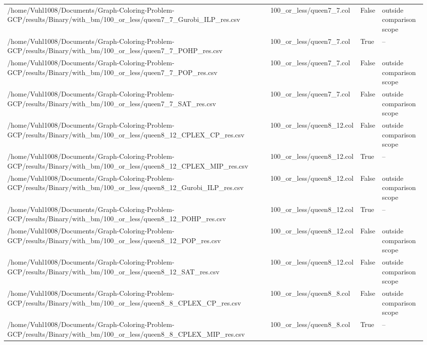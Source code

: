\begin{table}[htbp]
\begin{tabular}{llll}
/home/Vuhl1008/Documents/Graph-Coloring-Problem-GCP/results/Binary/with\_bm/100\_or\_less/queen7\_7\_Gurobi\_ILP\_res.csv & 100\_or\_less/queen7\_7.col & False & outside comparison scope \\
/home/Vuhl1008/Documents/Graph-Coloring-Problem-GCP/results/Binary/with\_bm/100\_or\_less/queen7\_7\_POHP\_res.csv & 100\_or\_less/queen7\_7.col & True & -- \\
/home/Vuhl1008/Documents/Graph-Coloring-Problem-GCP/results/Binary/with\_bm/100\_or\_less/queen7\_7\_POP\_res.csv & 100\_or\_less/queen7\_7.col & False & outside comparison scope \\
/home/Vuhl1008/Documents/Graph-Coloring-Problem-GCP/results/Binary/with\_bm/100\_or\_less/queen7\_7\_SAT\_res.csv & 100\_or\_less/queen7\_7.col & False & outside comparison scope \\
/home/Vuhl1008/Documents/Graph-Coloring-Problem-GCP/results/Binary/with\_bm/100\_or\_less/queen8\_12\_CPLEX\_CP\_res.csv & 100\_or\_less/queen8\_12.col & False & outside comparison scope \\
/home/Vuhl1008/Documents/Graph-Coloring-Problem-GCP/results/Binary/with\_bm/100\_or\_less/queen8\_12\_CPLEX\_MIP\_res.csv & 100\_or\_less/queen8\_12.col & True & -- \\
/home/Vuhl1008/Documents/Graph-Coloring-Problem-GCP/results/Binary/with\_bm/100\_or\_less/queen8\_12\_Gurobi\_ILP\_res.csv & 100\_or\_less/queen8\_12.col & False & outside comparison scope \\
/home/Vuhl1008/Documents/Graph-Coloring-Problem-GCP/results/Binary/with\_bm/100\_or\_less/queen8\_12\_POHP\_res.csv & 100\_or\_less/queen8\_12.col & True & -- \\
/home/Vuhl1008/Documents/Graph-Coloring-Problem-GCP/results/Binary/with\_bm/100\_or\_less/queen8\_12\_POP\_res.csv & 100\_or\_less/queen8\_12.col & False & outside comparison scope \\
/home/Vuhl1008/Documents/Graph-Coloring-Problem-GCP/results/Binary/with\_bm/100\_or\_less/queen8\_12\_SAT\_res.csv & 100\_or\_less/queen8\_12.col & False & outside comparison scope \\
/home/Vuhl1008/Documents/Graph-Coloring-Problem-GCP/results/Binary/with\_bm/100\_or\_less/queen8\_8\_CPLEX\_CP\_res.csv & 100\_or\_less/queen8\_8.col & False & outside comparison scope \\
/home/Vuhl1008/Documents/Graph-Coloring-Problem-GCP/results/Binary/with\_bm/100\_or\_less/queen8\_8\_CPLEX\_MIP\_res.csv & 100\_or\_less/queen8\_8.col & True & -- \\

\end{tabular}
\end{table}
